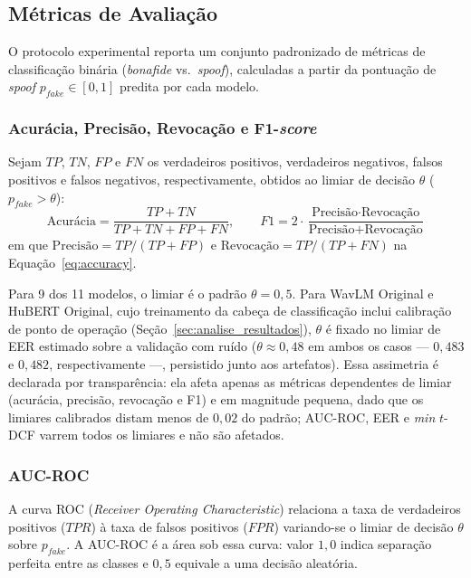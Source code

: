 \documentclass[12pt,a4paper]{article}
\begin{document}
\subsection{Métricas de Avaliação}
\label{sec:metricas}

O protocolo experimental reporta um conjunto padronizado de métricas de
classificação binária (\textit{bonafide} vs.\ \textit{spoof}), calculadas a
partir da pontuação de \textit{spoof} $p_{fake} \in [0,1]$ predita por cada
modelo.

\subsubsection*{Acurácia, Precisão, Revocação e F1-\textit{score}}

Sejam $TP$, $TN$, $FP$ e $FN$ os verdadeiros positivos, verdadeiros negativos,
falsos positivos e falsos negativos, respectivamente, obtidos ao limiar de
decisão $\theta$ ($p_{fake} > \theta$):
\begin{equation}
\label{eq:accuracy}
\text{Acurácia} = \frac{TP + TN}{TP + TN + FP + FN}, \qquad
F1 = 2 \cdot \frac{\text{Precisão} \cdot \text{Revocação}}{\text{Precisão} + \text{Revocação}}
\end{equation}
\noindent
em que $\text{Precisão} = TP/(TP+FP)$ e $\text{Revocação} = TP/(TP+FN)$ na
Equação~\ref{eq:accuracy}.

Para \num{9} dos \num{11} modelos, o limiar é o padrão $\theta = 0{,}5$. Para
WavLM Original e HuBERT Original, cujo treinamento da cabeça de classificação
inclui calibração de ponto de operação (Seção~\ref{sec:analise_resultados}),
$\theta$ é fixado no limiar de EER estimado sobre a validação com ruído
($\theta \approx 0{,}48$ em ambos os casos --- $0{,}483$ e $0{,}482$,
respectivamente ---, persistido junto aos artefatos). Essa assimetria é declarada por
transparência: ela afeta apenas as métricas dependentes de limiar (acurácia,
precisão, revocação e F1) e em magnitude pequena, dado que os limiares
calibrados distam menos de $0{,}02$ do padrão; AUC-ROC, EER e \textit{min}
$t$-DCF varrem todos os limiares e não são afetados.

\subsubsection*{AUC-ROC}

A curva ROC (\textit{Receiver Operating Characteristic}) relaciona a taxa de
verdadeiros positivos ($TPR$) à taxa de falsos positivos ($FPR$) variando-se o
limiar de decisão $\theta$ sobre $p_{fake}$. A AUC-ROC é a área sob essa curva:
valor $1{,}0$ indica separação perfeita entre as classes e $0{,}5$ equivale a
uma decisão aleatória.
\end{document}
